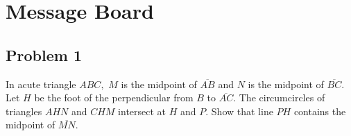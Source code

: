 \section{Message Board}

\subsection{Problem 1}

In acute triangle $ABC,$ $M$ is the midpoint of $\overline{AB}$ and $N$ is the midpoint of $\overline{BC}.$ Let $H$ be the foot of the perpendicular from $B$ to $\overline{AC}.$ The circumcircles of triangles $AHN$ and $CHM$ intersect at $H$ and $P.$ Show that line $PH$ contains the midpoint of $\overline{MN}.$

